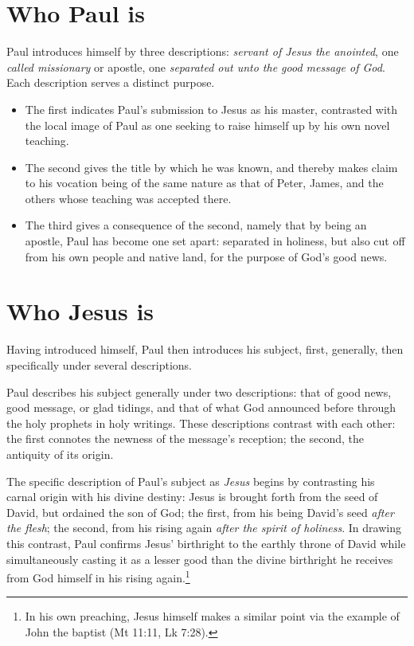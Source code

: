 \section{Who Paul is}
Paul introduces himself by three descriptions: \emph{servant of Jesus the anointed}, one \emph{called missionary} or apostle, one \emph{separated out unto the good message of God}. Each description serves a distinct purpose. 
\begin{itemize}
	\item The first indicates Paul's submission to Jesus as his master, contrasted with the local image of Paul as one seeking to raise himself up by his own novel teaching. 
	\item The second gives the title by which he was known, and thereby makes claim to his vocation being of the same nature as that of Peter, James, and the others whose teaching was accepted there.
	\item The third gives a consequence of the second, namely that by being an apostle, Paul has become one set apart: separated in holiness, but also cut off from his own people and native land, for the purpose of God's good news. 
\end{itemize}


\section{Who Jesus is}
Having introduced himself, Paul then introduces his subject, first, generally, then specifically under several descriptions. 

Paul describes his subject generally under two descriptions: that of good news, good message, or glad tidings, and that of what God announced before through the holy prophets in holy writings. These descriptions contrast with each other: the first connotes the newness of the message's reception; the second, the antiquity of its origin. 

The specific description of Paul's subject as \emph{Jesus} begins by contrasting his carnal origin with his divine destiny: Jesus is brought forth from the seed of David, but ordained the son of God; the first, from his being David's seed \emph{after the flesh}; the second, from his rising again \emph{after the spirit of holiness}. In drawing this contrast, Paul confirms Jesus' birthright to the earthly throne of David while simultaneously casting it as a lesser good than the divine birthright he receives from God himself in his rising again.\footnote{In his own preaching, Jesus himself makes a similar point via the example of John the baptist (Mt 11:11, Lk 7:28).}

